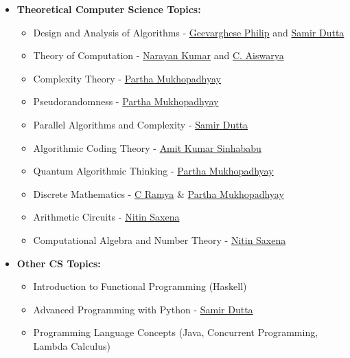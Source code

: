 \documentclass[10pt,a4paper,sans,colorlinks]{moderncv}        %
\begin{document}
\begin{itemize}
\begin{itemize}

		      \item \textbf{Theoretical Computer Science Topics:} \begin{itemize}
			            \item Design and Analysis of Algorithms - \href{https://www.cmi.ac.in/~gphilip/}{Geevarghese Philip} and \href{https://www.cmi.ac.in/~sdatta/}{Samir Dutta}
			            \item Theory of Computation - \href{https://www.cmi.ac.in/~kumar/}{Narayan Kumar} and \href{https://www.cmi.ac.in/~aiswarya/}{C. Aiswarya}
			            \item Complexity Theory - \href{https://www.cmi.ac.in/~partham/}{Partha Mukhopadhyay}
			             \item Pseudorandomness - \href{https://www.cmi.ac.in/~partham/}{Partha Mukhopadhyay}
			            \item Parallel Algorithms and Complexity - \href{https://www.cmi.ac.in/~sdatta/}{Samir Dutta}
			            \item Algorithmic Coding Theory - \href{https://www.cmi.ac.in/people/fac-profile.php?id=amitks}{Amit Kumar Sinhababu}
			            \item Quantum Algorithmic Thinking - \href{https://www.cmi.ac.in/~partham/}{Partha Mukhopadhyay}
			            \item Discrete Mathematics - \href{https://sites.google.com/cse.iitm.ac.in/c-ramya}{C Ramya} \& \href{https://www.cmi.ac.in/~partham/}{Partha Mukhopadhyay}
			            \item Arithmetic Circuits - \href{https://www.cse.iitk.ac.in/users/nitin/}{Nitin Saxena}
			            \item Computational Algebra and Number Theory - \href{https://www.cse.iitk.ac.in/users/nitin/}{Nitin Saxena}
		            \end{itemize}
		            \vspace*{5mm}
		      \item \textbf{Other CS Topics:} \begin{itemize}
			            \item Introduction to Functional Programming (Haskell)
			            \item Advanced Programming with Python - \href{https://www.cmi.ac.in/~sdatta/}{Samir Dutta}
			            \item Programming Language Concepts (Java, Concurrent Programming, Lambda Calculus)
		            \end{itemize}



\end{itemize}
\end{itemize}
\end{document}
